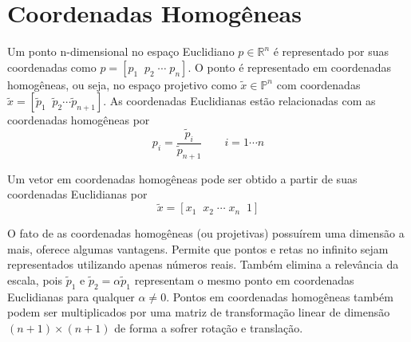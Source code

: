 \chapter{Coordenadas Homogêneas} \label{chap:hom_coordinates}

Um ponto n-dimensional no espaço Euclidiano $p \in \mathbb{R}^n$ é representado por suas coordenadas como $p = [p_1 \;\; p_2 \; \cdots \; p_n]$. 
O ponto é representado em coordenadas homogêneas, ou seja, no espaço projetivo como $\tilde{x} \in \mathbb{P}^n$ com coordenadas $\tilde{x} = [\tilde{p}_1 \;\; \tilde{p}_2  \cdots \tilde{p}_{n+1}]$. 
As coordenadas Euclidianas estão relacionadas com as coordenadas homogêneas por
\begin{equation}
p_i  = \frac{\tilde{p}_i}{\tilde{p}_{n+1}} \qquad i = 1 \cdots n
\end{equation}

Um vetor em coordenadas homogêneas pode ser obtido a partir de suas coordenadas Euclidianas por
\begin{equation}
\tilde{x} = [x_1 \;\; x_2 \; \cdots \; x_n \;\; 1]
\end{equation}

O fato de as coordenadas homogêneas (ou projetivas) possuírem uma dimensão a mais, oferece algumas vantagens. Permite que pontos e retas no infinito sejam representados utilizando apenas números reais. 
Também elimina a relevância da escala, pois $\tilde{p}_1$ e $\tilde{p}_2 = \alpha \tilde{p}_1$ representam o mesmo ponto em coordenadas Euclidianas para qualquer $\alpha \neq 0$. Pontos em coordenadas homogêneas também podem ser multiplicados por uma matriz de transformação linear de dimensão $(n+1) \times (n+1)$ de forma a sofrer rotação e translação.
